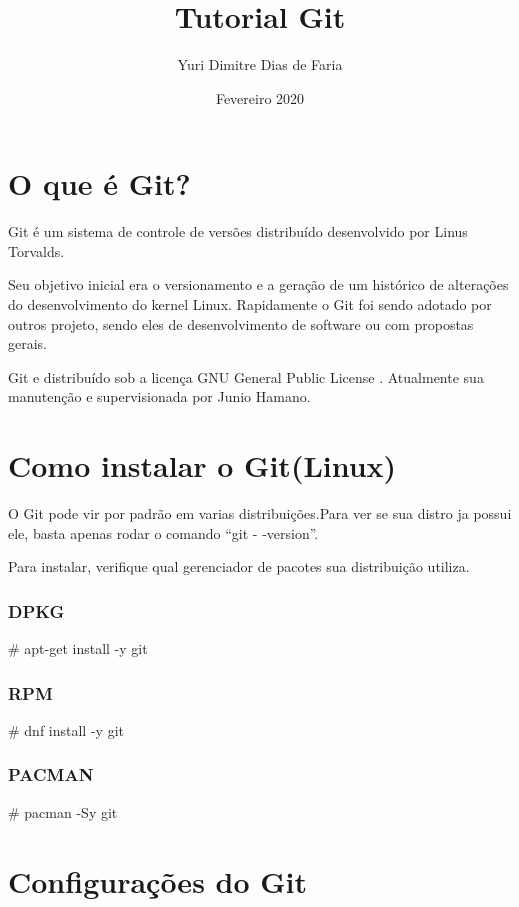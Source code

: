 \documentclass[]{article}
\title{Tutorial Git}
\author{Yuri Dimitre Dias de Faria}
\date{Fevereiro 2020}
\begin{document}
\maketitle    

\section{O que é Git?}


Git é um sistema de controle de versões distribuído desenvolvido por Linus Torvalds.


Seu objetivo inicial era o versionamento e a geração de um histórico de alterações do desenvolvimento do kernel Linux.
Rapidamente o Git foi sendo adotado por outros projeto, sendo eles de desenvolvimento de software ou com propostas gerais.


Git e distribuído sob a licença GNU General Public License . Atualmente sua manutenção e supervisionada por Junio Hamano.

\section{Como instalar o Git(Linux)}


O Git pode vir por padrão em varias distribuições.Para ver se sua distro ja possui ele, basta apenas rodar o comando ``git - -version''.


Para instalar, verifique qual gerenciador de pacotes sua distribuição utiliza.

\subsubsection*{DPKG}

\# apt-get install -y git 

\subsubsection*{RPM}

\# dnf install -y git    

\subsubsection*{PACMAN}

\# pacman -Sy git



\section{Configurações do Git}
\end{document}
